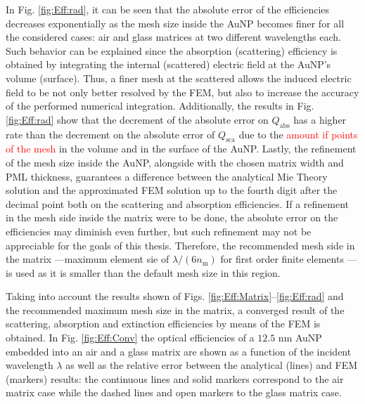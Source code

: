 In Fig. \ref{fig:Eff:rad}, it can be seen that the absolute error of the efficiencies decreases exponentially as the mesh size inside the AuNP becomes finer for all the considered cases: air and glass matrices at two different wavelengths each. Such behavior can be explained since the absorption (scattering) efficiency is obtained by integrating the internal (scattered) electric field at the AuNP's volume (surface). Thus, a finer mesh at the scattered allows the induced electric field to be not only better resolved by the FEM, but also to increase the accuracy of the performed numerical integration. Additionally,  the results in Fig. \ref{fig:Eff:rad} show that the decrement of the absolute error on $Q_\text{abs}$ has a higher rate than the decrement on the absolute error of $Q_\text{sca}$ due to the \textcolor{red}{amount if points of the mesh} in the volume and in the surface of the AuNP. Lastly, the refinement of the mesh size inside the AuNP, alongside with the chosen matrix width and PML thickness, guarantees a difference between the analytical Mie Theory solution and the approximated FEM solution up to the fourth digit after the decimal point both on the scattering and absorption efficiencies. If a refinement in the mesh side inside the matrix were to be done, the absolute error on the efficiencies may diminish even further, but such refinement may not be appreciable for the goals of this thesis. Therefore, the recommended mesh side in the matrix ---maximum element sie of $\lambda/(6n_\text{m})$ for first order finite elements \cite{comsol_doc}--- is used as it is smaller than the default mesh size in this region.

Taking into account the results shown of Figs. \ref{fig:Eff:Matrix}--\ref{fig:Eff:rad} and the recommended maximum mesh size in the matrix, a converged result of the scattering, absorption and extinction efficiencies by means of the FEM is obtained. In Fig. \ref{fig:Eff:Conv} the optical efficiencies of a $12.5$ nm AuNP embedded into an air and a glass matrix are shown as a function of the incident wavelength $\lambda$ as well as the relative error between the analytical (lines) and FEM (markers) results: the continuous lines and solid markers correspond to the air matrix case while  the dashed lines and open markers to the glass matrix case.

